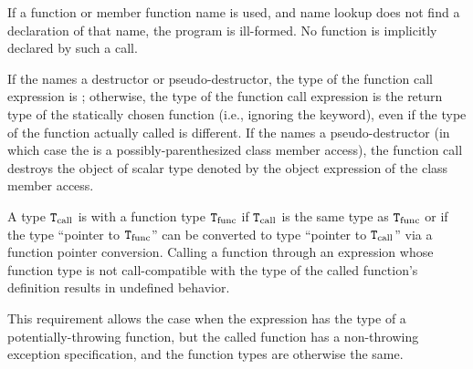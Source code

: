 \pnum
\begin{note}
If a function or member function name is used, and name
lookup does not find a declaration of that name,
the program is ill-formed. No function is implicitly declared by such a
call.
\end{note}

\pnum
If the  names
a destructor or pseudo-destructor,
the type of the function call expression is ; otherwise, the
type of the function call expression is the return type of the
statically chosen function (i.e., ignoring the  keyword),
even if the type of the function actually called is different.
%
If the  names a pseudo-destructor
(in which case the 
is a possibly-parenthesized class member access),
the function call destroys
the object of scalar type
denoted by the object expression
of the class member access.

\pnum
A type $\tcode{T}_\text{call}$ is
 with a function type $\tcode{T}_\text{func}$
if $\tcode{T}_\text{call}$ is the same type as $\tcode{T}_\text{func}$ or
if the type ``pointer to $\tcode{T}_\text{func}$'' can be
converted to type ``pointer to $\tcode{T}_\text{call}$''
via a function pointer conversion.
Calling a function through an
expression whose function type
is not call-compatible with the
type of the called function's
definition results in undefined behavior.
\begin{note}
This requirement allows the case
when the expression has the type of a
potentially-throwing function, but the called function has
a non-throwing exception specification,
and the function types are otherwise the same.
\end{note}

